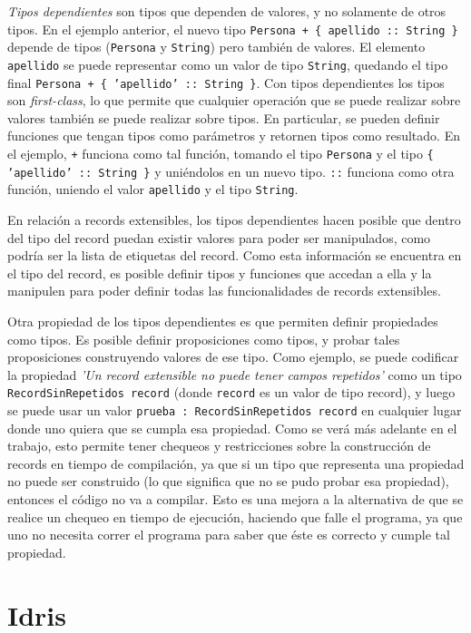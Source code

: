 \textit{Tipos dependientes} son tipos que dependen de valores, y no solamente de otros tipos. En el ejemplo anterior, el nuevo tipo \texttt{Persona + \{ apellido :: String \}} depende de tipos (\texttt{Persona} y \texttt{String}) pero también de valores. El elemento \texttt{apellido} se puede representar como un valor de tipo \texttt{String}, quedando el tipo final \texttt{Persona + \{ 'apellido' :: String \}}. Con tipos dependientes los tipos son \textit{first-class}, lo que permite que cualquier operación que se puede realizar sobre valores también se puede realizar sobre tipos. En particular, se pueden definir funciones que tengan tipos como parámetros y retornen tipos como resultado. En el ejemplo, \texttt{+} funciona como tal función, tomando el tipo \texttt{Persona} y el tipo \texttt{\{ 'apellido' :: String \}} y uniéndolos en un nuevo tipo. \texttt{::} funciona como otra función, uniendo el valor \texttt{apellido} y el tipo \texttt{String}.

En relación a records extensibles, los tipos dependientes hacen posible que dentro del tipo del record puedan existir valores para poder ser manipulados, como podría ser la lista de etiquetas del record. Como esta información se encuentra en el tipo del record, es posible definir tipos y funciones que accedan a ella y la manipulen para poder definir todas las funcionalidades de records extensibles.

Otra propiedad de los tipos dependientes es que permiten definir propiedades como tipos. Es posible definir proposiciones como tipos, y probar tales proposiciones construyendo valores de ese tipo. Como ejemplo, se puede codificar la propiedad \textit{'Un record extensible no puede tener campos repetidos'} como un tipo \texttt{RecordSinRepetidos record} (donde \texttt{record} es un valor de tipo record), y luego se puede usar un valor \texttt{prueba : RecordSinRepetidos record} en cualquier lugar donde uno quiera que se cumpla esa propiedad. Como se verá más adelante en el trabajo, esto permite tener chequeos y restricciones sobre la construcción de records en tiempo de compilación, ya que si un tipo que representa una propiedad no puede ser construido (lo que significa que no se pudo probar esa propiedad), entonces el código no va a compilar. Esto es una mejora a la alternativa de que se realice un chequeo en tiempo de ejecución, haciendo que falle el programa, ya que uno no necesita correr el programa para saber que éste es correcto y cumple tal propiedad.

\section{Idris}

